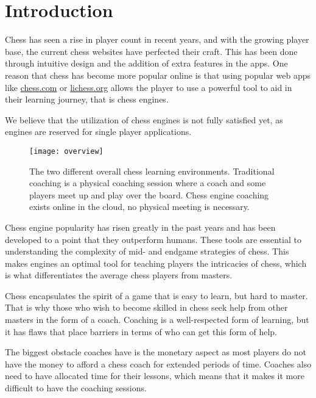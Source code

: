 \chapter{Introduction}\label{ch:introduction}

Chess has seen a rise in player count in recent years, and with the growing player base, the current chess websites have
perfected their craft.
This has been done through intuitive design and the addition of extra features in the apps.
One reason that chess has become more popular online is that using popular web apps like \url{chess.com} or
\url{lichess.org} allows the player to use a powerful tool to aid in their learning journey, that is chess engines.

We believe that the utilization of chess engines is not fully satisfied yet, as engines are reserved for single player
applications.

\begin{figure}[htb]
    \centering
    \texttt{[image: overview]}
    \caption{The two different overall chess learning environments.
    Traditional coaching is a physical coaching session where a coach and some players meet up and play over the board.
    Chess engine coaching exists online in the cloud, no physical meeting is necessary.}\label{fig:project-overview}
\end{figure}

Chess engine popularity has risen greatly in the past years and has been developed to a point that they
outperform humans.
These tools are essential to understanding the complexity of mid- and endgame strategies of chess.
This makes engines an optimal tool for teaching players the intricacies of chess, which is what
differentiates the average chess players from masters.

Chess encapsulates the spirit of a game that is easy to learn, but hard to master.
That is why those who wish to become skilled in chess seek help from other masters in the form of a coach.
Coaching is a well-respected form of learning, but it has flaws that place barriers in terms of who can get this form of
help.

The biggest obstacle coaches have is the monetary aspect as most players do not have the money to afford a chess coach
for extended periods of time.
Coaches also need to have allocated time for their lessons, which means that it makes it more difficult to have the
coaching sessions.

